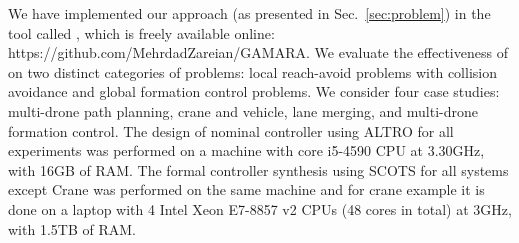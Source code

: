 We have implemented our approach (as presented in Sec.~\ref{sec:problem}) in the tool called \tool, which is freely available online: https://github.com/MehrdadZareian/GAMARA.
We evaluate the effectiveness of \tool on two distinct categories of problems: 
local reach-avoid problems with collision avoidance and global formation control problems. 
We consider four case studies: multi-drone path planning, crane and vehicle, lane merging, and multi-drone formation control. 
The design of nominal controller using ALTRO for all experiments was performed on a machine with core i5-4590 CPU at 3.30GHz, with 16GB of RAM.
The formal controller synthesis using SCOTS for all systems except Crane was performed on the same machine and for crane example it is done on a laptop with 4 Intel Xeon E7-8857 v2 CPUs (48 cores in total) at 3GHz, with 1.5TB of RAM. 

